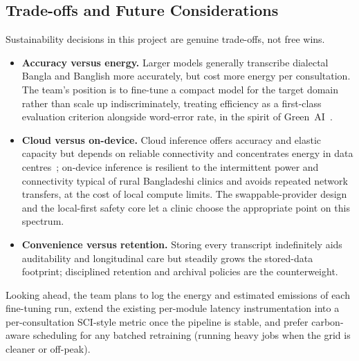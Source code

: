 \documentclass[11pt,a4paper]{article}
\begin{document}
\subsection{Trade-offs and Future Considerations}
Sustainability decisions in this project are genuine trade-offs, not free wins.

\begin{itemize}
  \item \textbf{Accuracy versus energy.} Larger models generally transcribe dialectal
  Bangla and Banglish more accurately, but cost more energy per consultation. The team's
  position is to fine-tune a compact model for the target domain rather than scale up
  indiscriminately, treating efficiency as a first-class evaluation criterion alongside
  word-error rate, in the spirit of Green~AI~\cite{schwartz2020}.
  \item \textbf{Cloud versus on-device.} Cloud inference offers accuracy and elastic
  capacity but depends on reliable connectivity and concentrates energy in data
  centres~\cite{iea2025}; on-device inference is resilient to the intermittent power and
  connectivity typical of rural Bangladeshi clinics and avoids repeated network
  transfers, at the cost of local compute limits. The swappable-provider design and the
  local-first safety core let a clinic choose the appropriate point on this spectrum.
  \item \textbf{Convenience versus retention.} Storing every transcript indefinitely aids
  auditability and longitudinal care but steadily grows the stored-data footprint;
  disciplined retention and archival policies are the counterweight.
\end{itemize}

Looking ahead, the team plans to log the energy and estimated emissions of each
fine-tuning run, extend the existing per-module latency instrumentation into a
per-consultation SCI-style metric once the pipeline is stable, and prefer carbon-aware
scheduling for any batched retraining (running heavy jobs when the grid is cleaner or
off-peak).
\end{document}
